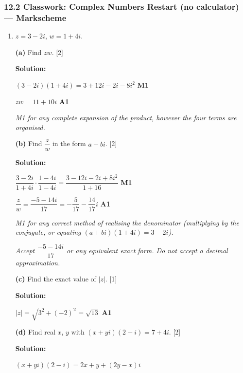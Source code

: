 \documentclass[12pt, twoside]{article}
\begin{document}
\subsubsection*{12.2 Classwork: Complex Numbers Restart (no calculator)
--- Markscheme}

\begin{enumerate}[itemsep=0.3cm]

\item[1.] [Maximum mark: 7]

$z = 3 - 2i$, $w = 1 + 4i$.

\medskip

\textbf{(a)} Find $zw$. \hfill [2]

\textbf{Solution:}

$(3 - 2i)(1 + 4i) = 3 + 12i - 2i - 8i^2$ \hfill \textbf{M1}

$zw = 11 + 10i$ \hfill \textbf{A1}

\emph{M1 for any complete expansion of the product, however the four terms
are organised.}

\medskip

\textbf{(b)} Find $\dfrac{z}{w}$ in the form $a + bi$. \hfill [2]

\textbf{Solution:}

$\dfrac{3 - 2i}{1 + 4i} \cdot \dfrac{1 - 4i}{1 - 4i}
= \dfrac{3 - 12i - 2i + 8i^2}{1 + 16}$ \hfill \textbf{M1}

$\dfrac{z}{w} = \dfrac{-5 - 14i}{17} = -\dfrac{5}{17} - \dfrac{14}{17}i$
\hfill \textbf{A1}

\emph{M1 for any correct method of realising the denominator (multiplying
by the conjugate, or equating $(a+bi)(1+4i) = 3-2i$).}

\emph{Accept $\dfrac{-5 - 14i}{17}$ or any equivalent exact form. Do not
accept a decimal approximation.}

\medskip

\textbf{(c)} Find the exact value of $|z|$. \hfill [1]

\textbf{Solution:}

$|z| = \sqrt{3^2 + (-2)^2} = \sqrt{13}$ \hfill \textbf{A1}

\medskip

\textbf{(d)} Find real $x$, $y$ with $(x + yi)(2 - i) = 7 + 4i$. \hfill [2]

\textbf{Solution:}

$(x + yi)(2 - i) = 2x + y + (2y - x)i$


\end{enumerate}
\end{document}
